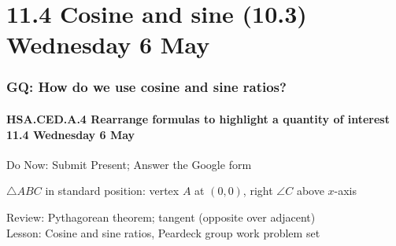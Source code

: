 \documentclass{beamer}
\begin{document}
\section{11.4 Cosine and sine (10.3) Wednesday 6 May} 
\frame
{
  \frametitle{GQ: How do we use cosine and sine ratios?}
  \framesubtitle{HSA.CED.A.4 Rearrange formulas to highlight a quantity of interest \hfill \alert{11.4 Wednesday 6 May}}

  \begin{block}{Do Now: Submit Present; Answer the Google form} \vspace{0.5cm}
    \begin{multicols}{2}
      $\triangle ABC$ in standard position: vertex $A$ at $(0,0)$, right $\angle C$ above $x$-axis
  \end{multicols}
    \end{block}
    Review: Pythagorean theorem; tangent (opposite over adjacent)\\[0.25cm]
    Lesson: Cosine and sine ratios, 
    Peardeck group work problem set}
\end{document}
